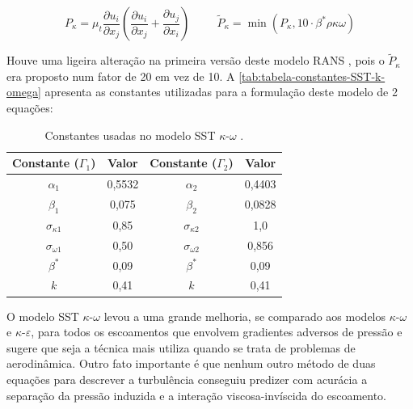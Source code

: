 \begin{equation}
	\label{eq:producao-tilde-k-modelo-sst-k-omega}
	P_{\kappa} = \mu_{t}\frac{\partial u_i}{\partial x_j}\left(\frac{\partial u_i}{\partial x_j} + \frac{\partial u_j}{\partial x_i}\right)
	\hspace{1cm}
	\tilde{P}_{\kappa} = \min(P_\kappa, 10\cdot\beta^{*}\rho\kappa\omega)
\end{equation}

Houve uma ligeira alteração na primeira versão deste modelo RANS \cite{Menter1994TwoequationET}, pois o $\tilde{P}_{\kappa}$ era proposto num fator de 20 em vez de 10. A \autoref{tab:tabela-constantes-SST-k-omega} apresenta as constantes utilizadas para a formulação deste modelo de 2 equações:

\begin{table}[ht]
\centering
\caption[Constantes usadas no modelo SST $\kappa$-$\omega$.]{Constantes usadas no modelo SST $\kappa$-$\omega$ \cite{Menter1994TwoequationET,Menter2003,Menter2009}.}
\vspace{0.5cm}
\begin{tabular}{c|c|c|c}
 
Constante ($\Gamma_1$) & Valor & Constante ($\Gamma_2$) & Valor \\
\hline
$\alpha_1$ & 0,5532 & $\alpha_2$ & 0,4403 \\
$\beta_1$ & 0,075 & $\beta_2$ & 0,0828 \\
$\sigma_{\kappa 1}$ & 0,85 & $\sigma_{\kappa 2}$ & 1,0 \\
$\sigma_{\omega 1}$ & 0,50 & $\sigma_{\omega 2}$ & 0,856 \\
$\beta^{*}$ & 0,09 & $\beta^{*}$ & 0,09 \\
$k$ & 0,41 & $k$ & 0,41

\end{tabular}
\label{tab:tabela-constantes-SST-k-omega}
\end{table}

O modelo SST $\kappa$-$\omega$ levou a uma grande melhoria, se comparado aos modelos $\kappa$-$\omega$ e $\kappa$-$\varepsilon$, para todos os escoamentos que envolvem gradientes adversos de pressão e \citeauthor{Menter1994TwoequationET} sugere que seja a técnica mais utiliza quando se trata de problemas de aerodinâmica. Outro fato importante é que nenhum outro método de duas equações para descrever a turbulência conseguiu predizer com acurácia a separação da pressão induzida e a interação viscosa-invíscida do escoamento.